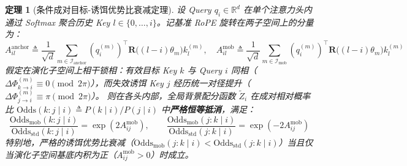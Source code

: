 \documentclass[11pt,a4paper]{article}
\newtheorem{theorem}{定理}
\theoremstyle{definition}
\begin{document}
\begin{theorem}[条件成对目标-诱饵优势比衰减定理]
\label{thm:odds_ratio}
设 Query $q_i \in \mathbb{R}^d$ 在单个注意力头内通过 Softmax 聚合历史 Key $l \in \{0, \dots, i\}$。记基准 RoPE 旋转在两子空间上的分量为：
\begin{equation}
A_{il}^{\text{anchor}} \triangleq \frac{1}{\sqrt{d}}\sum_{m\in\mathcal{I}_{\text{anchor}}} (q_i^{(m)})^\top \mathbf{R}\big((l-i)\theta_m\big) k_l^{(m)}, \quad
A_{il}^{\text{mob}} \triangleq \frac{1}{\sqrt{d}}\sum_{m\in\mathcal{I}_{\text{mob}}} (q_i^{(m)})^\top \mathbf{R}\big((l-i)\theta_m\big) k_l^{(m)}
\end{equation}
假定在演化子空间上相干锁相：有效目标 Key $k$ 与 Query $i$ 同相（$\Delta\Phi_{k\to i}^{(m)} \equiv 0 \pmod{2\pi}$），而失效诱饵 Key $j$ 经历统一对径提升（$\Delta\Phi_{j\to i}^{(m)} \equiv \pi \pmod{2\pi}$）。
则在各头内部，全局背景配分函数 $\tilde{Z}_i$ 在成对相对概率比 $\mathrm{Odds}(k:j\mid i) \triangleq P(k\mid i)/P(j\mid i)$ 中\textbf{严格恒等抵消}，满足：
\begin{equation}
\frac{\mathrm{Odds}_{\mathrm{mob}}(k : j \mid i)}{\mathrm{Odds}_{\mathrm{std}}(k : j \mid i)} = \exp\!\left(2 A_{ij}^{\text{mob}}\right), \qquad
\frac{\mathrm{Odds}_{\mathrm{mob}}(j : k \mid i)}{\mathrm{Odds}_{\mathrm{std}}(j : k \mid i)} = \exp\!\left(-2 A_{ij}^{\text{mob}}\right)
\end{equation}
特别地，严格的诱饵优势比衰减（$\mathrm{Odds}_{\mathrm{mob}}(j:k\mid i) < \mathrm{Odds}_{\mathrm{std}}(j:k\mid i)$）当且仅当演化子空间基底内积为正（$A_{ij}^{\text{mob}} > 0$）时成立。
\end{theorem}
\end{document}
